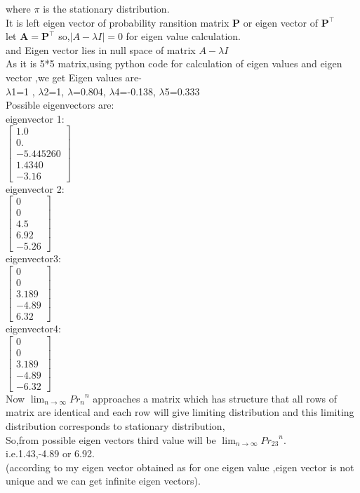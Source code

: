 \documentclass[journel,12pt,twocoloums]{IEEEtran}
\begin{document}
where $\pi$ is the stationary distribution.\\
It is left eigen vector of probability ransition matrix $\mathbf{P}$ or eigen vector of $\mathbf{P}^ \intercal$\\
let $\mathbf{A}=\mathbf{P}^\intercal$
so,$|A-\lambda I|=0$ for eigen value calculation.\\
and Eigen vector lies in null space of matrix $A-\lambda I$\\
As it is 5*5 matrix,using python code for calculation of eigen values and eigen vector ,we get
Eigen values are-\\
$\lambda$1=1 , $\lambda$2=1, $\lambda$=0.804, $\lambda$4=-0.138, $\lambda$5=0.333\\
Possible eigenvectors are: \\
eigenvector 1:\\
\begin{math}
\left[
\begin{array}{c}
     1.0\\
     0.\\
     -5.445260\\
     1.4340\\
      -3.16
\end{array}\right]
\end{math}
\\
 eigenvector 2:\\
\begin{math}
\left[
\begin{array}{c}
      0\\
      0\\
      4.5\\
      6.92\\
      -5.26
\end{array}\right]
\end{math}
\\
eigenvector3:\\
\begin{math}
\left[
\begin{array}{c}
      0\\
      0\\
      3.189\\
      -4.89\\
      6.32
\end{array}\right]
\end{math}
\\
eigenvector4:\\
\begin{math}
\left[
\begin{array}{c}
      0\\
      0\\
      3.189\\
      -4.89\\
      -6.32
\end{array}\right]
\end{math}
\\
Now $\lim_{n \to \infty } {Pr_{n}}^n$ approaches a matrix which has structure that all rows of matrix are identical and each row will give limiting distribution and this limiting distribution corresponds to stationary distribution,\\

So,from possible eigen vectors third value will be $\lim_{n \to \infty } {Pr_{23}}^n$.
\\
i.e.1.43,-4.89 or 6.92.\\ (according to my eigen vector obtained as for one eigen value ,eigen vector is not unique and we can get infinite eigen vectors).
\end{document}
